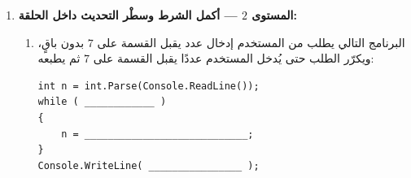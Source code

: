\documentclass[14pt]{extarticle}
\begin{document}
\begin{enumerate}[itemsep=2em]
\begin{enumerate}
    \item البرنامج التالي يطلب من المستخدم إدخال عدد موجب (أكبر من $0$). طالما أدخل المستخدم عددًا أصغر أو يساوي $0$، يطبع البرنامج رسالة خطأ ويطلب عددًا جديدًا:
\begin{boxCode}
\begin{english}
\begin{verbatim}
int x = int.Parse(Console.ReadLine());
while ( ____________ )
{
    Console.WriteLine("Error! Enter a positive number:");
    x = int.Parse(Console.ReadLine());
}
Console.WriteLine("Thank you! You entered: " + x);
\end{verbatim}
\end{english}
\end{boxCode}
\end{enumerate}
\ifwithsols
\begin{boxSolution}
\begin{enumerate}[nosep]
    \item الشرط هو: \textenglish{n != 0}
    \item الشرط هو: \textenglish{x <= 0}
\end{enumerate}
\end{boxSolution}
\fi
\filbreak

\item \textbf{المستوى $2$ — أكمل الشرط وسطْر التحديث داخل الحلقة:}
\begin{enumerate}
    \item البرنامج التالي يطلب من المستخدم إدخال عدد يقبل القسمة على $7$ بدون باقٍ، ويكرّر الطلب حتى يُدخل المستخدم عددًا يقبل القسمة على $7$ ثم يطبعه:
\begin{boxCode}
\begin{english}
\begin{verbatim}
int n = int.Parse(Console.ReadLine());
while ( ____________ )
{
    n = ____________________________;
}
Console.WriteLine( ________________ );
\end{verbatim}
\end{english}
\end{boxCode}


\end{enumerate}
\end{enumerate}
\end{document}
